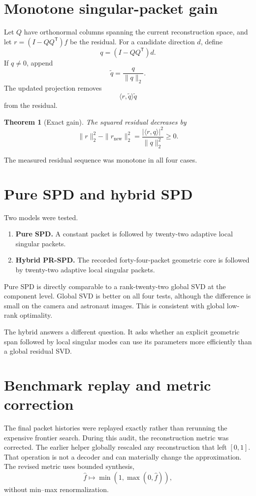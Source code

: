 \documentclass[11pt]{article}
\newtheorem{theorem}{Theorem}[section]
\theoremstyle{definition}
\theoremstyle{remark}
\begin{document}
\section{Monotone singular-packet gain}
Let $Q$ have orthonormal columns spanning the current reconstruction space, and let $r=(I-QQ^{\mathsf T})f$ be the residual. For a candidate direction $d$, define
\[
q=(I-QQ^{\mathsf T})d.
\]
If $q\ne0$, append
\[
\widetilde q=\frac q{\|q\|_2}.
\]
The updated projection removes
\[
\langle r,\widetilde q\rangle\widetilde q
\]
from the residual.

\begin{theorem}[Exact gain]
The squared residual decreases by
\[
\boxed{
\|r\|_2^2-\|r_{\mathrm{new}}\|_2^2
=
\frac{|\langle r,q\rangle|^2}{\|q\|_2^2}
\ge0.
}
\]
\end{theorem}

The measured residual sequence was monotone in all four cases.

\section{Pure SPD and hybrid SPD}
Two models were tested.

\begin{enumerate}
\item \textbf{Pure SPD.} A constant packet is followed by twenty-two adaptive local singular packets.
\item \textbf{Hybrid PR-SPD.} The recorded forty-four-packet geometric core is followed by twenty-two adaptive local singular packets.
\end{enumerate}

Pure SPD is directly comparable to a rank-twenty-two global SVD at the component level. Global SVD is better on all four tests, although the difference is small on the camera and astronaut images. This is consistent with global low-rank optimality.

The hybrid answers a different question. It asks whether an explicit geometric span followed by local singular modes can use its parameters more efficiently than a global residual SVD.

\section{Benchmark replay and metric correction}
The final packet histories were replayed exactly rather than rerunning the expensive frontier search. During this audit, the reconstruction metric was corrected. The earlier helper globally rescaled any reconstruction that left $[0,1]$. That operation is not a decoder and can materially change the approximation. The revised metric uses bounded synthesis,
\[
\widehat f\longmapsto\min(1,\max(0,\widehat f)),
\]
without min--max renormalization.
\end{document}
